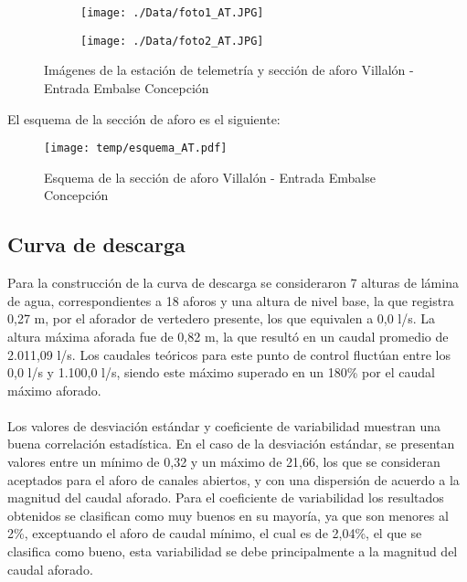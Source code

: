 \documentclass[]{article}
\begin{document}
\begin{figure}[H]
  \centering
\begin{subfigure}{.49\textwidth}
  \texttt{[image: ./Data/foto1\_AT.JPG]}
\end{subfigure}
\hfill
\begin{subfigure}{.49\textwidth}
  \texttt{[image: ./Data/foto2\_AT.JPG]}
\end{subfigure}
\caption{Imágenes de la estación de telemetría y sección de aforo Villalón - Entrada Embalse Concepción}
\label{fig:fotos_20}
\end{figure}

El esquema de la sección de aforo es el siguiente:

\begin{figure}[H]
  \centering
  \texttt{[image: temp/esquema\_AT.pdf]}
\caption{Esquema de la sección de aforo Villalón - Entrada Embalse Concepción}
\label{fig:Esquema_AT}
\end{figure}

\subsection{Curva de descarga}\label{curva-de-descarga-19}

Para la construcción de la curva de descarga se consideraron 7 alturas de lámina de agua, correspondientes a 18 aforos y una altura de nivel base, la que registra 0,27 m, por el aforador de vertedero presente, los que equivalen a 0,0 l/s. La altura máxima aforada fue de 0,82 m, la que resultó en un caudal promedio de 2.011,09 l/s. Los caudales teóricos para este punto de control fluctúan entre los 0,0 l/s y 1.100,0 l/s, siendo este máximo superado en un 180\% por el caudal máximo aforado.\\
\\
Los valores de desviación estándar y coeficiente de variabilidad muestran una buena correlación estadística. En el caso de la desviación estándar, se presentan valores entre un mínimo de 0,32 y un máximo de 21,66, los que se consideran aceptados para el aforo de canales abiertos, y con una dispersión de acuerdo a la magnitud del caudal aforado. Para el coeficiente de variabilidad los resultados obtenidos se clasifican como muy buenos en su mayoría, ya que son menores al 2\%, exceptuando el aforo de caudal mínimo, el cual es de 2,04\%, el que se clasifica como bueno, esta variabilidad se debe principalmente a la magnitud del caudal aforado.
\end{document}
